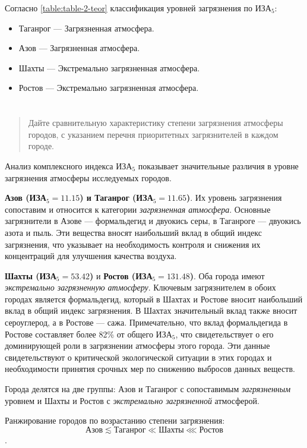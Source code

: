 Согласно \cref{table:table-2-teor} классификация уровней загрязнения по ИЗА$_5$:
\begin{itemize}
    \item Таганрог --- Загрязненная атмосфера.
    \item Азов --- Загрязненная атмосфера.
    \item Шахты --- Экстремально загрязненная атмосфера.
    \item Ростов --- Экстремально загрязненная атмосфера.
\end{itemize}

\section*{  }
\begin{quote}
    Дайте сравнительную характеристику степени загрязнения атмосферы городов, с указанием перечня приоритетных загрязнителей в каждом городе.
\end{quote}

Анализ комплексного индекса ИЗА$_5$ показывает значительные различия в уровне загрязнения атмосферы исследуемых городов.

\textbf{Азов (ИЗА$_5 = 11.15$) и Таганрог (ИЗА$_5 = 11.65$)}.
Их уровень загрязнения сопоставим и относится к категории \textit{загрязненная атмосфера}.
Основные загрязнители в Азове --- формальдегид и двуокись серы, в Таганроге --- двуокись азота и пыль.
Эти вещества вносят наибольший вклад в общий индекс загрязнения, что указывает на необходимость контроля и снижения их концентраций для улучшения качества воздуха.

\textbf{Шахты (ИЗА$_5 = 53.42$)} и \textbf{Ростов (ИЗА$_5 = 131.48$)}.
Оба города имеют \textit{экстремально загрязненную атмосферу}.
Ключевым загрязнителем в обоих городах является формальдегид, который в Шахтах и Ростове вносит наибольший вклад в общий индекс загрязнения.
В Шахтах значительный вклад также вносит сероуглерод, а в Ростове --- сажа.
Примечательно, что вклад формальдегида в Ростове составляет более 82\% от общего ИЗА$_5$, что свидетельствует о его доминирующей роли в загрязнении атмосферы этого города.
Эти данные свидетельствуют о критической экологической ситуации в этих городах и необходимости принятия срочных мер по снижению выбросов данных веществ.

Города делятся на две группы: Азов и Таганрог с сопоставимым \textit{загрязненным} уровнем и Шахты и Ростов с \textit{экстремально загрязненной} атмосферой.

Ранжирование городов по возрастанию степени загрязнения:
$$ \text{Азов} \lesssim \text{Таганрог} \ll \text{Шахты} \lll \text{Ростов} $$.
